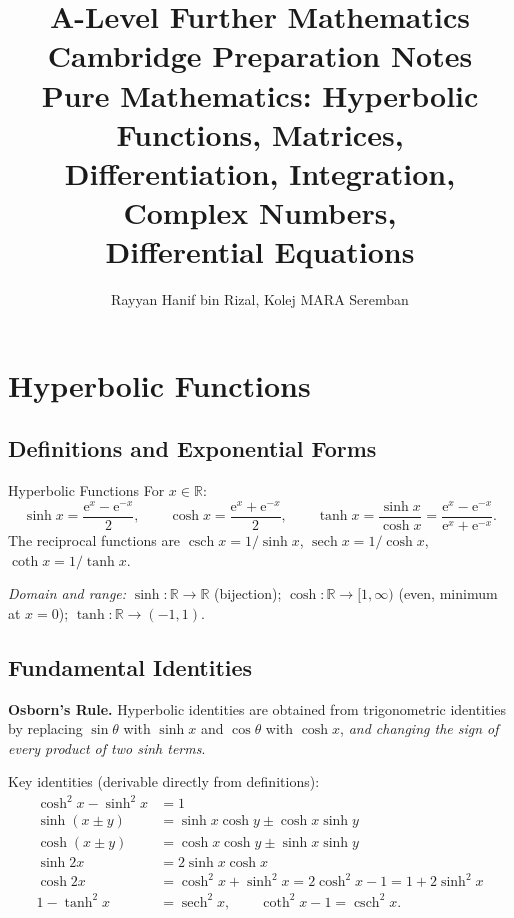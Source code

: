 \documentclass[12pt, a4paper]{book}
\title{%
  \Huge\textbf{A-Level Further Mathematics}\\[0.5em]
  \Large Cambridge Preparation Notes\\[1em]
  \large Pure Mathematics: Hyperbolic Functions, Matrices,\\
  Differentiation, Integration, Complex Numbers,\\
  Differential Equations
}
\author{Rayyan Hanif bin Rizal, Kolej MARA Seremban}
\date{}
\newenvironment{keyresult}{%
  \begin{tcolorbox}[keystyle]%
}{%
  \end{tcolorbox}%
}
\DeclareMathOperator{\sech}{sech}
\DeclareMathOperator{\csch}{csch}
\newcommand{\R}{\mathbb{R}}
\newcommand{\e}{\mathrm{e}}
\begin{document}

\maketitle
\tableofcontents
\newpage

\chapter{Hyperbolic Functions}

\section{Definitions and Exponential Forms}

\begin{definition}{Hyperbolic Functions}{}
For $x \in \R$:
\[
\sinh x = \frac{\e^x - \e^{-x}}{2}, \qquad
\cosh x = \frac{\e^x + \e^{-x}}{2}, \qquad
\tanh x = \frac{\sinh x}{\cosh x} = \frac{\e^x - \e^{-x}}{\e^x + \e^{-x}}.
\]
The reciprocal functions are $\csch x = 1/\sinh x$, $\sech x = 1/\cosh x$, $\coth x = 1/\tanh x$.
\end{definition}

\textit{Domain and range:} $\sinh:\R\to\R$ (bijection); $\cosh:\R\to[1,\infty)$ (even, minimum at $x=0$); $\tanh:\R\to(-1,1)$.

\section{Fundamental Identities}

\begin{keyresult}
\textbf{Osborn's Rule.} Hyperbolic identities are obtained from trigonometric identities by replacing $\sin\theta$ with $\sinh x$ and $\cos\theta$ with $\cosh x$, \emph{and changing the sign of every product of two sinh terms}.
\end{keyresult}

Key identities (derivable directly from definitions):
\begin{align}
\cosh^2 x - \sinh^2 x &= 1 \label{eq:hpythagorean}\\
\sinh(x \pm y) &= \sinh x\cosh y \pm \cosh x\sinh y \\
\cosh(x \pm y) &= \cosh x\cosh y \pm \sinh x\sinh y \\
\sinh 2x &= 2\sinh x\cosh x \\
\cosh 2x &= \cosh^2 x + \sinh^2 x = 2\cosh^2 x - 1 = 1 + 2\sinh^2 x \\
1 - \tanh^2 x &= \sech^2 x, \qquad \coth^2 x - 1 = \csch^2 x.
\end{align}
\end{document}
